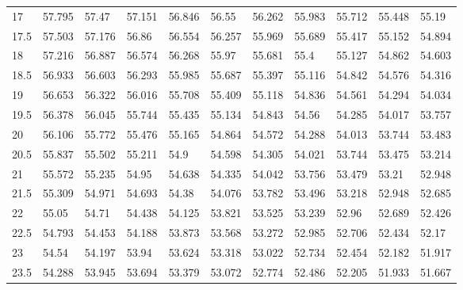 \begin{bibunit}
\begin{table}[]
\begin{tabular}{lllllllllll}
				17   & 57.795 & 57.47  & 57.151 & 56.846 & 56.55  & 56.262 & 55.983 & 55.712 & 55.448 & 55.19  \\
				17.5 & 57.503 & 57.176 & 56.86  & 56.554 & 56.257 & 55.969 & 55.689 & 55.417 & 55.152 & 54.894 \\
				18   & 57.216 & 56.887 & 56.574 & 56.268 & 55.97  & 55.681 & 55.4   & 55.127 & 54.862 & 54.603 \\
				18.5 & 56.933 & 56.603 & 56.293 & 55.985 & 55.687 & 55.397 & 55.116 & 54.842 & 54.576 & 54.316 \\
				19   & 56.653 & 56.322 & 56.016 & 55.708 & 55.409 & 55.118 & 54.836 & 54.561 & 54.294 & 54.034 \\
				19.5 & 56.378 & 56.045 & 55.744 & 55.435 & 55.134 & 54.843 & 54.56  & 54.285 & 54.017 & 53.757 \\
				20   & 56.106 & 55.772 & 55.476 & 55.165 & 54.864 & 54.572 & 54.288 & 54.013 & 53.744 & 53.483 \\
				20.5 & 55.837 & 55.502 & 55.211 & 54.9   & 54.598 & 54.305 & 54.021 & 53.744 & 53.475 & 53.214 \\
				21   & 55.572 & 55.235 & 54.95  & 54.638 & 54.335 & 54.042 & 53.756 & 53.479 & 53.21  & 52.948 \\
				21.5 & 55.309 & 54.971 & 54.693 & 54.38  & 54.076 & 53.782 & 53.496 & 53.218 & 52.948 & 52.685 \\
				22   & 55.05  & 54.71  & 54.438 & 54.125 & 53.821 & 53.525 & 53.239 & 52.96  & 52.689 & 52.426 \\
				22.5 & 54.793 & 54.453 & 54.188 & 53.873 & 53.568 & 53.272 & 52.985 & 52.706 & 52.434 & 52.17  \\
				23   & 54.54  & 54.197 & 53.94  & 53.624 & 53.318 & 53.022 & 52.734 & 52.454 & 52.182 & 51.917 \\
				23.5 & 54.288 & 53.945 & 53.694 & 53.379 & 53.072 & 52.774 & 52.486 & 52.205 & 51.933 & 51.667\\
		\midrule
	\end{tabular}
\end{table}


\end{bibunit}
